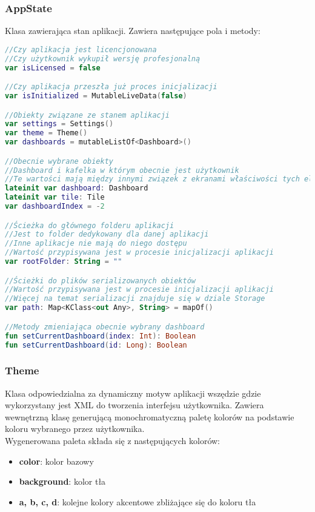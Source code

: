 \newpage

\subsubsection{AppState}
Klasa zawierająca stan aplikacji. Zawiera następujące pola i metody:

\begin{lstlisting}[language=Kotlin]
//Czy aplikacja jest licencjonowana
//Czy użytkownik wykupił wersję profesjonalną
var isLicensed = false

//Czy aplikacja przeszła już proces inicjalizacji
var isInitialized = MutableLiveData(false)

//Obiekty związane ze stanem aplikacji
var settings = Settings()
var theme = Theme()
var dashboards = mutableListOf<Dashboard>()

//Obecnie wybrane obiekty
//Dashboard i kafelka w którym obecnie jest użytkownik
//Te wartości mają między innymi związek z ekranami właściwości tych elementów
lateinit var dashboard: Dashboard
lateinit var tile: Tile
var dashboardIndex = -2

//Ścieżka do głównego folderu aplikacji
//Jest to folder dedykowany dla danej aplikacji
//Inne aplikacje nie mają do niego dostępu
//Wartość przypisywana jest w procesie inicjalizacji aplikacji
var rootFolder: String = ""

//Ścieżki do plików serializowanych obiektów
//Wartość przypisywana jest w procesie inicjalizacji aplikacji
//Więcej na temat serializacji znajduje się w dziale Storage
var path: Map<KClass<out Any>, String> = mapOf()

//Metody zmieniająca obecnie wybrany dashboard
fun setCurrentDashboard(index: Int): Boolean
fun setCurrentDashboard(id: Long): Boolean
\end{lstlisting}

\newpage

\subsubsection{Theme}
Klasa odpowiedzialna za dynamiczny motyw aplikacji wszędzie gdzie wykorzystany jest XML do tworzenia interfejsu użytkownika. Zawiera wewnętrzną klasę  generującą monochromatyczną paletę kolorów na podstawie koloru wybranego przez użytkownika.\\

Wygenerowana paleta składa się z następujących kolorów:
\begin{itemize}[leftmargin=*]
    \item \textbf{color}: kolor bazowy
    \item \textbf{background}: kolor tła
    \item \textbf{a, b, c, d}: kolejne kolory akcentowe zbliżające się do koloru tła
\end{itemize}

